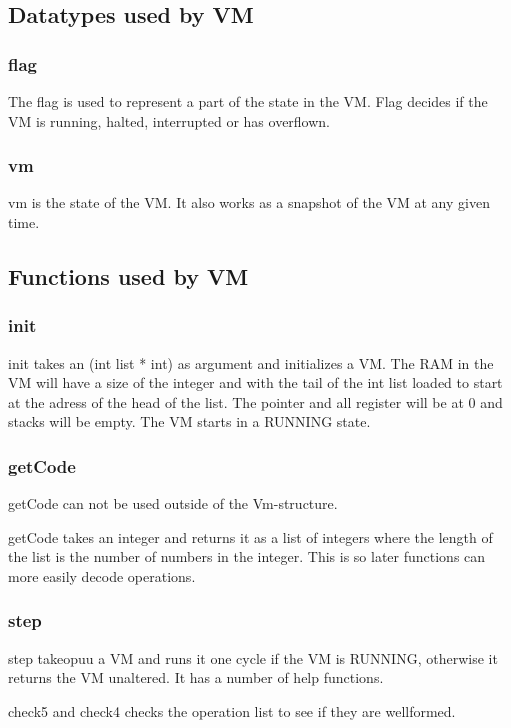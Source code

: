 \subsection{Datatypes used by VM}

\subsubsection{flag}
The flag is used to represent a part of the state in the VM. Flag decides if the VM is running, halted, interrupted or has overflown.

\subsubsection{vm}
vm is the state of the VM. It also works as a snapshot of the VM at any given time.

\subsection{Functions used by VM}

\subsubsection{init}
init takes an (int list * int) as argument and initializes a VM. The RAM in the VM will have a size of the integer and with the tail of the int list loaded to start at the adress of the head of the list. The pointer and all register will be at 0 and stacks will be empty. The VM starts in a RUNNING state.

\subsubsection{getCode}
getCode can not be used outside of the Vm-structure.

getCode takes an integer and returns it as a list of integers where the length of the list is the number of numbers in the integer. This is so later functions can more easily decode operations.

\subsubsection{step}
step takeopuu a VM and runs it one cycle if the VM is RUNNING, otherwise it returns the VM unaltered. It has a number of help functions.

check5 and check4 checks the operation list to see if they are wellformed.

